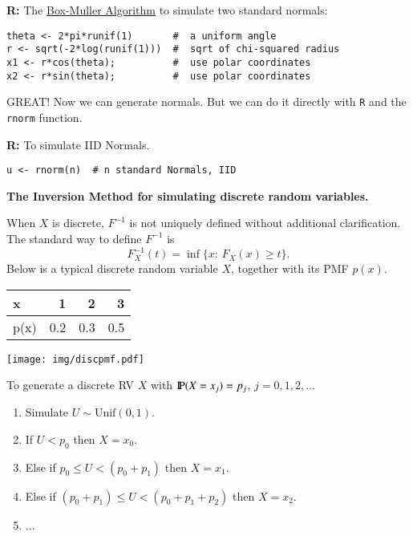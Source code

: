 \documentclass[11pt,english]{scrbook}
\begin{document}
\begin{enumerate}
\textbf{R:} The \uline{Box-Muller Algorithm} to simulate two standard normals:

\begin{verbatim}
theta <- 2*pi*runif(1)       #  a uniform angle
r <- sqrt(-2*log(runif(1)))  #  sqrt of chi-squared radius
x1 <- r*cos(theta);          #  use polar coordinates
x2 <- r*sin(theta);          #  use polar coordinates  
\end{verbatim}

GREAT! Now we can generate normals. But we can do it directly with \texttt{R} and the \texttt{rnorm} function.

\textbf{R:} To simulate IID Normals.

\begin{verbatim}
u <- rnorm(n)  # n standard Normals, IID
\end{verbatim}


\textbf{The Inversion Method for simulating discrete random variables.}  

When \(X\) is discrete, \(F^{-1}\) is not uniquely defined without additional clarification. The standard way to define \(F^{-1}\) is 
\[
F_{X}^{-1}(t)=\inf\{x:\, F_{X}(x)\geq t\}.
\]
Below is a typical discrete random variable \(X\), together with its PMF \(p(x)\).

\begin{center}
\begin{tabular}{lrrr}
x & 1 & 2 & 3\\
\hline
p(x) & 0.2 & 0.3 & 0.5\\
\end{tabular}
\end{center}

\begin{center}
\begin{center}
\texttt{[image: img/discpmf.pdf]}
\end{center}

\end{center}

To generate a discrete RV \(X\) with \(\P(X=x_{j})=p_{j}\), \(j=0,1,2,\ldots\)
\begin{enumerate}
\item Simulate \(U \sim \mathrm{Unif}(0,1)\).
\item If \(U<p_{0}\) then \(X=x_{0}\).
\item Else if \(p_{0}\leq U<(p_{0}+p_{1})\) then \(X=x_{1}\).
\item Else if \((p_{0}+p_{1})\leq U<(p_{0}+p_{1}+p_{2})\) then \(X=x_{2}\).
\item \(\ldots\)
\end{enumerate}


\end{enumerate}
\end{document}
